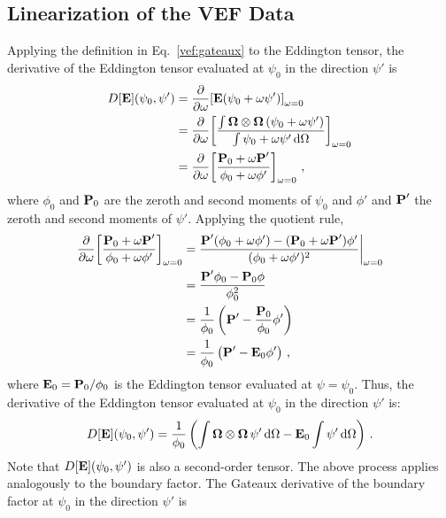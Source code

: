 \documentclass[../doc.tex]{subfiles}
\begin{document}
\subsection{Linearization of the VEF Data}
Applying the definition in Eq.~\ref{vef:gateaux} to the Eddington tensor, the derivative of the Eddington tensor evaluated at $\psi_0$ in the direction $\psi'$ is 
	\begin{equation}
	\begin{aligned}
		D[\E](\psi_0,\psi') &= \pderiv{}{\omega} \bracket{\E(\psi_0 + \omega\psi')}_{\omega=0} \\
		&= \pderiv{}{\omega}\bracket{\frac{\int \Omegahat\otimes\Omegahat\paren{\psi_0 + \omega\psi'}}{\int \psi_0 + \omega \psi' \ud \Omega}}_{\omega=0} \\
		&= \pderiv{}{\omega}\bracket{\frac{\P_0 + \omega\P'}{\phi_0 + \omega\phi'}}_{\omega=0} \,,
	\end{aligned}
	\end{equation}
where $\phi_0$ and $\P_0$ are the zeroth and second moments of $\psi_0$ and $\phi'$ and $\P'$ the zeroth and second moments of $\psi'$. Applying the quotient rule, 
	\begin{equation}
	\begin{aligned}
		\pderiv{}{\omega}\bracket{\frac{\P_0 + \omega\P'}{\phi_0 + \omega\phi'}}_{\omega=0} &= \frac{\P'(\phi_0 + \omega \phi') - (\P_0 + \omega\P')\phi'}{(\phi_0 + \omega\phi')^2} \biggr\rvert_{\omega=0} \\
		&= \frac{\P' \phi_0 - \P_0 \phi}{\phi_0^2} \\
		&= \frac{1}{\phi_0}\paren{\P' - \frac{\P_0}{\phi_0} \phi'} \\
		&= \frac{1}{\phi_0}\paren{\P' - \E_0 \phi'} \,, 
	\end{aligned}
	\end{equation}
where $\E_0 = \P_0/\phi_0$ is the Eddington tensor evaluated at $\psi = \psi_0$. 
Thus, the derivative of the Eddington tensor evaluated at $\psi_0$ in the direction $\psi'$ is: 
	\begin{equation} \label{vef:Edd_deriv}
		D[\E](\psi_0,\psi') = \frac{1}{\phi_0} \paren{\int \Omegahat\otimes\Omegahat\,\psi'\ud\Omega - \E_0\int \psi' \ud \Omega} \,. 
	\end{equation}
Note that $D[\E](\psi_0,\psi')$ is also a second-order tensor. The above process applies analogously to the boundary factor. 
The Gateaux derivative of the boundary factor at $\psi_0$ in the direction $\psi'$ is 
\end{document}
